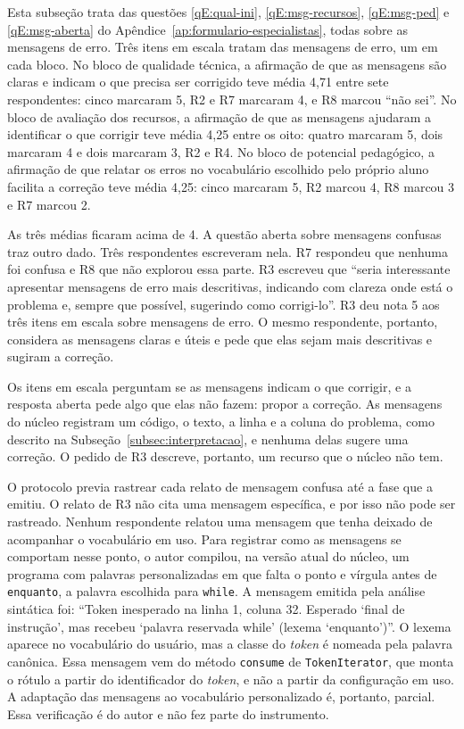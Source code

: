 Esta subseção trata das questões \ref{qE:qual-ini}, \ref{qE:msg-recursos}, \ref{qE:msg-ped} e \ref{qE:msg-aberta} do Apêndice~\ref{ap:formulario-especialistas}, todas sobre as mensagens de erro. Três itens em escala tratam das mensagens de erro, um em cada bloco. No bloco de qualidade técnica, a afirmação de que as mensagens são claras e indicam o que precisa ser corrigido teve média 4,71 entre sete respondentes: cinco marcaram 5, R2 e R7 marcaram 4, e R8 marcou ``não sei''. No bloco de avaliação dos recursos, a afirmação de que as mensagens ajudaram a identificar o que corrigir teve média 4,25 entre os oito: quatro marcaram 5, dois marcaram 4 e dois marcaram 3, R2 e R4. No bloco de potencial pedagógico, a afirmação de que relatar os erros no vocabulário escolhido pelo próprio aluno facilita a correção teve média 4,25: cinco marcaram 5, R2 marcou 4, R8 marcou 3 e R7 marcou 2.

As três médias ficaram acima de 4. A questão aberta sobre mensagens confusas traz outro dado. Três respondentes escreveram nela. R7 respondeu que nenhuma foi confusa e R8 que não explorou essa parte. R3 escreveu que ``seria interessante apresentar mensagens de erro mais descritivas, indicando com clareza onde está o problema e, sempre que possível, sugerindo como corrigi-lo''. R3 deu nota 5 aos três itens em escala sobre mensagens de erro. O mesmo respondente, portanto, considera as mensagens claras e úteis e pede que elas sejam mais descritivas e sugiram a correção.

Os itens em escala perguntam se as mensagens indicam o que corrigir, e a resposta aberta pede algo que elas não fazem: propor a correção. As mensagens do núcleo registram um código, o texto, a linha e a coluna do problema, como descrito na Subseção~\ref{subsec:interpretacao}, e nenhuma delas sugere uma correção. O pedido de R3 descreve, portanto, um recurso que o núcleo não tem.

O protocolo previa rastrear cada relato de mensagem confusa até a fase que a emitiu. O relato de R3 não cita uma mensagem específica, e por isso não pode ser rastreado. Nenhum respondente relatou uma mensagem que tenha deixado de acompanhar o vocabulário em uso. Para registrar como as mensagens se comportam nesse ponto, o autor compilou, na versão atual do núcleo, um programa com palavras personalizadas em que falta o ponto e vírgula antes de \texttt{enquanto}, a palavra escolhida para \texttt{while}. A mensagem emitida pela análise sintática foi: ``Token inesperado na linha 1, coluna 32. Esperado `final de instrução', mas recebeu `palavra reservada while' (lexema `enquanto')''. O lexema aparece no vocabulário do usuário, mas a classe do \textit{token} é nomeada pela palavra canônica. Essa mensagem vem do método \texttt{consume} de \texttt{TokenIterator}, que monta o rótulo a partir do identificador do \textit{token}, e não a partir da configuração em uso. A adaptação das mensagens ao vocabulário personalizado é, portanto, parcial. Essa verificação é do autor e não fez parte do instrumento.

